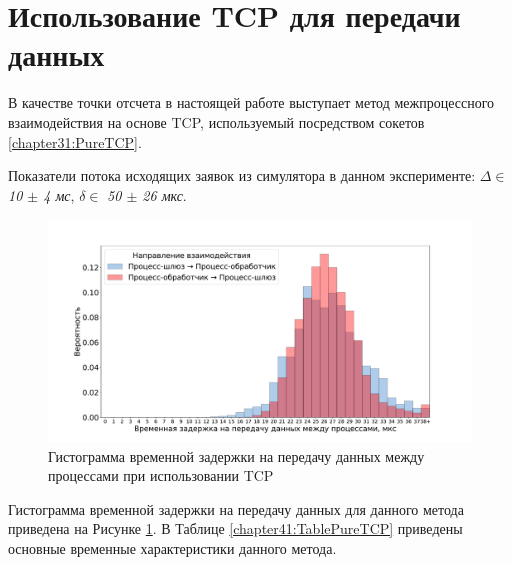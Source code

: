 \section{Использование TCP для передачи данных}


В качестве точки отсчета в настоящей работе выступает метод межпроцессного взаимодействия на основе TCP, используемый посредством сокетов 
\ref{chapter31:PureTCP}.

Показатели потока исходящих заявок из симулятора в данном эксперименте: $\Delta \in$ \textit{10 $\pm$ 4 мс}, $\delta \in$ \textit{50 $\pm$ 26 мкс}.

\begin{figure}[!h]
\caption{Гистограмма временной задержки на передачу данных между процессами при использовании TCP}
\label{chapter41:FigPureTCP}
\includegraphics[width=\textwidth]{../../graphics/hist/PureTCP}
\end{figure}

Гистограмма временной задержки на передачу данных для данного метода приведена на Рисунке \ref{chapter41:FigPureTCP}. В Таблице \ref{chapter41:TablePureTCP} приведены основные временные характеристики данного метода.

